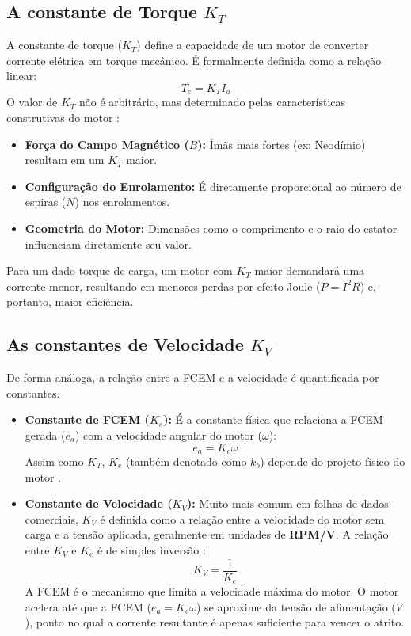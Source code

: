 \documentclass[12pt, a4paper, openright, oneside, brazilian]{abntex2}
\begin{document}
\subsection{\texorpdfstring{A constante de Torque $K_T$}{A constante de Torque KT}}
\label{KT}
A constante de torque ($K_T$) define a capacidade de um motor de converter corrente elétrica em torque mecânico. É formalmente definida como a relação linear:
\begin{equation}
    T_e = K_T I_a
\end{equation}
O valor de $K_T$ não é arbitrário, mas determinado pelas características construtivas do motor \parencite{hendershot1994design}:
\begin{itemize}
    \item \textbf{Força do Campo Magnético ($B$):} Ímãs mais fortes (ex: Neodímio) resultam em um $K_T$ maior.
    \item \textbf{Configuração do Enrolamento:} É diretamente proporcional ao número de espiras ($N$) nos enrolamentos.
    \item \textbf{Geometria do Motor:} Dimensões como o comprimento e o raio do estator influenciam diretamente seu valor.
\end{itemize}
Para um dado torque de carga, um motor com $K_T$ maior demandará uma corrente menor, resultando em menores perdas por efeito Joule ($P = I^2 R$) e, portanto, maior eficiência.

\subsection{\texorpdfstring{As constantes de Velocidade $K_V$}{As constantes de Velocidade KV}}
\label{KV}

De forma análoga, a relação entre a FCEM e a velocidade é quantificada por constantes.
\begin{itemize}
    \item \textbf{Constante de FCEM ($K_e$):} É a constante física que relaciona a FCEM gerada ($e_a$) com a velocidade angular do motor ($\omega$):
    \begin{equation}
        e_a = K_e \omega
    \end{equation}
    Assim como $K_T$, $K_e$ (também denotado como $k_b$) depende do projeto físico do motor \parencite{zoltan2012understanding}.

    \item \textbf{Constante de Velocidade ($K_V$):} Muito mais comum em folhas de dados comerciais, $K_V$ é definida como a relação entre a velocidade do motor sem carga e a tensão aplicada, geralmente em unidades de \textbf{RPM/V}. A relação entre $K_V$ e $K_e$ é de simples inversão \parencite{infineon2011bldc}:
    \begin{equation}
        K_V = \frac{1}{K_e}
    \end{equation}
    A FCEM é o mecanismo que limita a velocidade máxima do motor. O motor acelera até que a FCEM ($e_a = K_e \omega$) se aproxime da tensão de alimentação ($V$), ponto no qual a corrente resultante é apenas suficiente para vencer o atrito.
\end{itemize}
\end{document}
